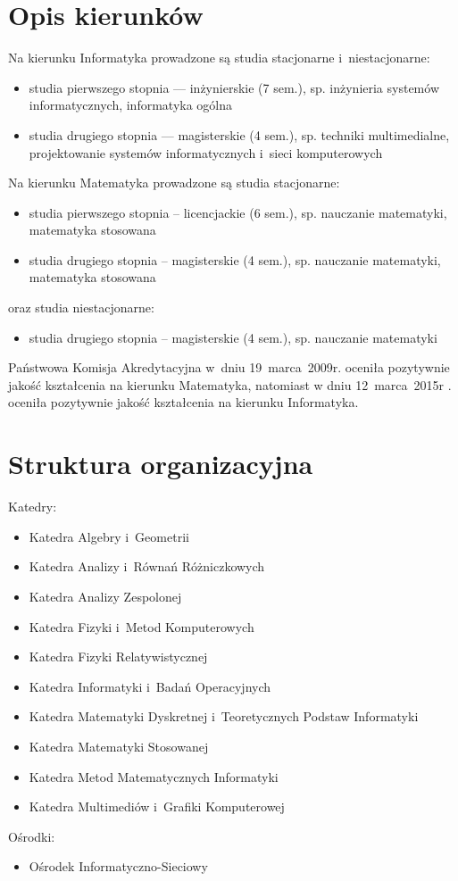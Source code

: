\documentclass[a4paper,12pt]{article}
\begin{document}
\section{Opis kierunków}
Na kierunku Informatyka prowadzone są studia stacjonarne i~niestacjonarne:
\begin{itemize}
\item studia pierwszego stopnia --- inżynierskie (7 sem.), sp. inżynieria systemów informatycznych, informatyka
ogólna
\item studia drugiego stopnia --- magisterskie (4 sem.), sp. techniki multimedialne, projektowanie systemów
informatycznych i~sieci komputerowych
\end{itemize}
Na kierunku 
Matematyka
 prowadzone są studia stacjonarne:
\begin{itemize}
\item studia pierwszego stopnia – licencjackie (6 sem.), sp. nauczanie matematyki, matematyka stosowana
\item studia drugiego stopnia – magisterskie (4 sem.), sp. nauczanie matematyki, matematyka stosowana
\end{itemize}
oraz studia niestacjonarne:
\begin{itemize}
\item studia drugiego stopnia – magisterskie (4 sem.), sp. nauczanie matematyki
\end{itemize}
Państwowa Komisja Akredytacyjna w~dniu 19~marca~2009r. oceniła pozytywnie jakość kształcenia na kierunku
Matematyka, natomiast w dniu 12~marca~2015r
. oceniła pozytywnie jakość kształcenia na kierunku
Informatyka.
\section{Struktura organizacyjna}
Katedry:
\begin{itemize}
\item Katedra Algebry i~Geometrii
\item Katedra Analizy i~Równań Różniczkowych
\item Katedra Analizy Zespolonej
\item Katedra Fizyki i~Metod Komputerowych
\item Katedra Fizyki Relatywistycznej
\item Katedra Informatyki i~Badań Operacyjnych
\item Katedra Matematyki Dyskretnej i~Teoretycznych Podstaw Informatyki
\item Katedra Matematyki Stosowanej
\item Katedra Metod Matematycznych Informatyki
\item Katedra Multimediów i~Grafiki Komputerowej
\end{itemize}
Ośrodki:
\begin{itemize}
\item Ośrodek Informatyczno-Sieciowy
\end{itemize}
\end{document}
